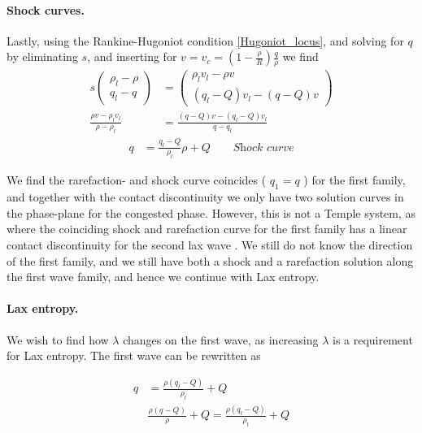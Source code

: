 \documentclass{article}
\numberwithin{equation}{section}
\begin{document}
\paragraph{Shock curves.}
Lastly, using the Rankine-Hugoniot condition \ref{Hugoniot_locus}, and solving for $q$ by eliminating $s$, and inserting for $v = v_c = (1- \frac{\rho}{R})\frac{q}{\rho}$ we find
\begin{align*}
     s \begin{pmatrix} \rho_l - \rho \\ q_l - q \end{pmatrix} &= \begin{pmatrix} \rho_l v_l - \rho v \\ (q_l - Q)v_l - (q - Q)v \end{pmatrix} \\
     \frac{\rho v - \rho_l v_l}{\rho - \rho_l} &= \frac{(q-Q)v - (q_l-Q)v_l}{q - q_l}
\end{align*}
\begin{align}
    q &= \frac{q_l - Q}{\rho_l} \rho + Q  \quad \quad \textit{Shock curve}
     \label{Shock}
\end{align}

We find the rarefaction- and shock curve coincides ( $q_1 = q$ ) for the first family, and together with the contact discontinuity we only have two solution curves in the phase-plane for the congested phase. However, this is not a Temple system, as where the coinciding shock and rarefaction curve for the first family has a linear contact discontinuity for the second lax wave \cite{Colombo2003}. We still do not know the direction of the first family, and we still have both a shock and a rarefaction solution along the first wave family, and hence we continue with Lax entropy. 

\paragraph{Lax entropy.}


We wish to find how $\lambda$ changes on the first wave, as increasing $\lambda$ is a requirement for Lax entropy. The first wave can be rewritten as 

\begin{align*}
q &=  \frac{\rho( q_l - Q)}{\rho_l} + Q \\
 & \frac{\rho( q - Q)}{\rho} + Q =  \frac{\rho( q_l - Q)}{\rho_l} + Q
\end{align*}
\end{document}
